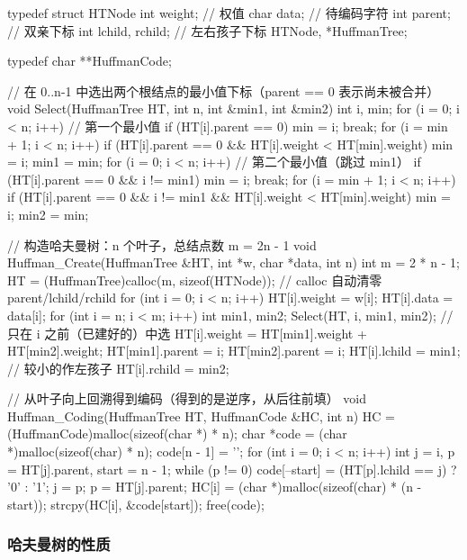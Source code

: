 \documentclass[11pt,openany,UTF8]{ctexbook}
\begin{document}
\begin{codebox}
typedef struct HTNode {
    int weight;         // 权值
    char data;          // 待编码字符
    int parent;         // 双亲下标
    int lchild, rchild; // 左右孩子下标
} HTNode, *HuffmanTree;

typedef char **HuffmanCode;

// 在 0..n-1 中选出两个根结点的最小值下标（parent == 0 表示尚未被合并）
void Select(HuffmanTree HT, int n, int &min1, int &min2) {
    int i, min;
    for (i = 0; i < n; i++)          // 第一个最小值
        if (HT[i].parent == 0) { min = i; break; }
    for (i = min + 1; i < n; i++)
        if (HT[i].parent == 0 && HT[i].weight < HT[min].weight) min = i;
    min1 = min;
    for (i = 0; i < n; i++)          // 第二个最小值（跳过 min1）
        if (HT[i].parent == 0 && i != min1) { min = i; break; }
    for (i = min + 1; i < n; i++)
        if (HT[i].parent == 0 && i != min1 && HT[i].weight < HT[min].weight) min = i;
    min2 = min;
}

// 构造哈夫曼树：n 个叶子，总结点数 m = 2n - 1
void Huffman_Create(HuffmanTree &HT, int *w, char *data, int n) {
    int m = 2 * n - 1;
    HT = (HuffmanTree)calloc(m, sizeof(HTNode));  // calloc 自动清零 parent/lchild/rchild
    for (int i = 0; i < n; i++) {
        HT[i].weight = w[i];
        HT[i].data = data[i];
    }
    for (int i = n; i < m; i++) {
        int min1, min2;
        Select(HT, i, min1, min2);                // 只在 i 之前（已建好的）中选
        HT[i].weight = HT[min1].weight + HT[min2].weight;
        HT[min1].parent = i;
        HT[min2].parent = i;
        HT[i].lchild = min1;                      // 较小的作左孩子
        HT[i].rchild = min2;
    }
}

// 从叶子向上回溯得到编码（得到的是逆序，从后往前填）
void Huffman_Coding(HuffmanTree HT, HuffmanCode &HC, int n) {
    HC = (HuffmanCode)malloc(sizeof(char *) * n);
    char *code = (char *)malloc(sizeof(char) * n);
    code[n - 1] = '\0';
    for (int i = 0; i < n; i++) {
        int j = i, p = HT[j].parent, start = n - 1;
        while (p != 0) {
            code[--start] = (HT[p].lchild == j) ? '0' : '1';
            j = p;
            p = HT[j].parent;
        }
        HC[i] = (char *)malloc(sizeof(char) * (n - start));
        strcpy(HC[i], &code[start]);
    }
    free(code);
}
\end{codebox}

\subsubsection{哈夫曼树的性质}
\end{document}
